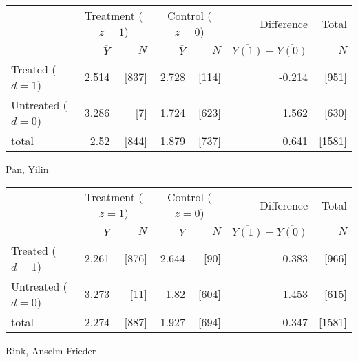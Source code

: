 \documentclass[11pt,notitlepage]{article}
\begin{document}
\begin{table}[h!]
\begin{center}
\begin{tabular}{l|rr|rr|rr}
  \hline
 & \multicolumn{2}{c|}{Treatment ($z=1$)} & \multicolumn{2}{c|}{Control ($z=0$)} & Difference & Total \\
 & $\overline{Y}$ & $N$ & $\overline{Y}$ & $N$ & $\overline{Y(1)} - \overline{Y(0)}$ & $N$ \\ 
  \hline
Treated ($d=1$) &  2.514 & [837] & 2.728 & [114] & -0.214 & [951] \\ 
  Untreated ($d=0$) & 3.286 & [7] & 1.724 & [623] & 1.562 & [630] \\ 
  \hline
  total & 2.52 & [844] & 1.879 & [737] & 0.641 & [1581] \\ 
   \hline
\end{tabular}
\end{center}
\end{table}

\clearpage

Pan, Yilin

\begin{table}[h!]
\begin{center}
\begin{tabular}{l|rr|rr|rr}
  \hline
 & \multicolumn{2}{c|}{Treatment ($z=1$)} & \multicolumn{2}{c|}{Control ($z=0$)} & Difference & Total \\
 & $\overline{Y}$ & $N$ & $\overline{Y}$ & $N$ & $\overline{Y(1)} - \overline{Y(0)}$ & $N$ \\ 
  \hline
Treated ($d=1$) &  2.261 & [876] & 2.644 & [90] & -0.383 & [966] \\ 
  Untreated ($d=0$) & 3.273 & [11] & 1.82 & [604] & 1.453 & [615] \\ 
  \hline
  total & 2.274 & [887] & 1.927 & [694] & 0.347 & [1581] \\ 
   \hline
\end{tabular}
\end{center}
\end{table}
Rink, Anselm Frieder
\end{document}
